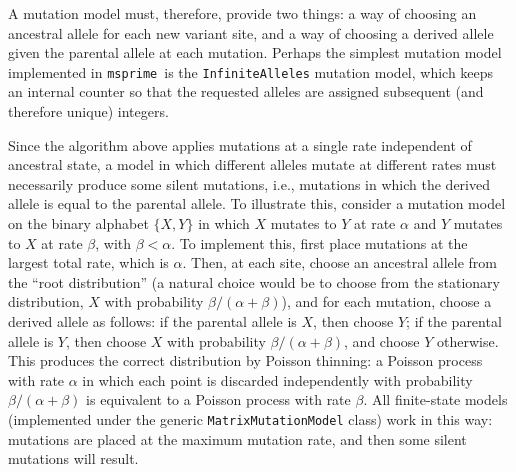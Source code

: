 \documentclass{article}
\newcommand{\msprime}[0]{\texttt{msprime}}
\begin{document}
A mutation model must, therefore, provide two things:
a way of choosing an ancestral allele for each new variant site,
and a way of choosing a derived allele given the parental allele at each mutation.
Perhaps the simplest mutation model implemented in \msprime\ is the
\texttt{InfiniteAlleles} mutation model,
which keeps an internal counter so that the requested alleles are
assigned subsequent (and therefore unique) integers.

Since the algorithm above applies mutations at a single rate
independent of ancestral state,
a model in which different alleles mutate at different rates
must necessarily produce some silent mutations,
i.e., mutations in which the derived allele is equal to the parental allele.
To illustrate this, consider a mutation model on the binary alphabet
$\{X, Y\}$ in which $X$ mutates to $Y$ at rate $\alpha$
and $Y$ mutates to $X$ at rate $\beta$, with $\beta < \alpha$.
To implement this, first place mutations at the largest total rate, which is $\alpha$.
Then, at each site, choose an ancestral allele from the ``root distribution''
(a natural choice would be to choose from the stationary distribution,
$X$ with probability $\beta / (\alpha + \beta)$),
and for each mutation, choose a derived allele as follows:
if the parental allele is $X$, then choose $Y$;
if the parental allele is $Y$, then choose $X$ with probability $\beta/(\alpha + \beta)$,
and choose $Y$ otherwise.
This produces the correct distribution by Poisson thinning:
a Poisson process with rate $\alpha$ in which each point is discarded independently
with probability $\beta / (\alpha + \beta)$ is equivalent to a Poisson
process with rate $\beta$.
All finite-state models (implemented under the generic \texttt{MatrixMutationModel} class)
work in this way: mutations are placed at the maximum mutation rate,
and then some silent mutations will result.
\end{document}
